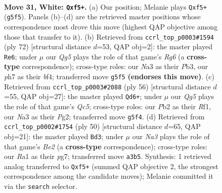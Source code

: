 \documentclass[11pt]{article}
\begin{document}
\clearpage

\begin{figure}[p]\centering
\begin{subfigure}{0.46\textwidth}\centering
\resizebox{\linewidth}{!}{%
\newchessgame
\chessboard[
  setfen={1rr5/5k1p/1p6/p4bQ1/7P/N7/PP3PP1/R5K1 w - - 9 31},
  showmover=false,
  pgfstyle=straightmove, color=movearrow, markmove={g5-f5}
]}
\caption{}
\end{subfigure}\hfill
\begin{subfigure}{0.46\textwidth}\centering
\resizebox{\linewidth}{!}{%
\newchessgame
\chessboard[
  setfen={r3r3/p6k/2p3R1/2N5/2P2bP1/1P2p3/P7/1K1R4 w - - 3 37},
  showmover=false,
  pgfstyle=straightmove, color=movearrow, markmove={g6-e6}
]}
\caption{}
\end{subfigure}
\\[4pt]
\begin{subfigure}{0.46\textwidth}\centering
\resizebox{\linewidth}{!}{%
\newchessgame
\chessboard[
  setfen={2rk3r/6b1/4p2p/2Qb2p1/PP6/8/5PPP/5RK1 w - - 1 29},
  showmover=false,
  pgfstyle=straightmove, color=movearrow, markmove={c5-d6}
]}
\caption{}
\end{subfigure}\hfill
\begin{subfigure}{0.46\textwidth}\centering
\resizebox{\linewidth}{!}{%
\newchessgame
\chessboard[
  setfen={2r5/5kpp/1p1Qbp2/8/5P2/4PK2/2r1B1PP/8 w - - 4 26},
  showmover=false,
  pgfstyle=straightmove, color=movearrow, markmove={e2-d3}
]}
\caption{}
\end{subfigure}
\caption{\textbf{Move 31, White: \texttt{Qxf5+}.} (a) Our position; Melanie plays \texttt{Qxf5+} (\texttt{g5f5}). Panels (b)--(d) are the retrieved master positions whose correspondence most drove this move (highest QAP objective among those that transfer to it). (b) Retrieved from \texttt{ccrl\_top\_p0003\#1594} (ply 72) [structural distance $d$=53, QAP obj=2]: the master played \texttt{Re6}; under $\mu$ our \emph{Qg5} plays the role of that game's \emph{Rg6} (a \textbf{cross-type} correspondence); cross-type roles: our \emph{N}a3 as their \emph{P}b3, our \emph{p}h7 as their \emph{b}f4; transferred move \texttt{g5f5} \textbf{(endorses this move)}. (c) Retrieved from \texttt{ccrl\_top\_p0003\#2088} (ply 56) [structural distance $d$=55, QAP obj=27]: the master played \texttt{Qd6+}; under $\mu$ our \emph{Qg5} plays the role of that game's \emph{Qc5}; cross-type roles: our \emph{P}b2 as their \emph{R}f1, our \emph{N}a3 as their \emph{P}g2; transferred move \texttt{g5f4}. (d) Retrieved from \texttt{ccrl\_top\_p0002\#1754} (ply 50) [structural distance $d$=65, QAP obj=21]: the master played \texttt{Bd3}; under $\mu$ our \emph{Na3} plays the role of that game's \emph{Be2} (a \textbf{cross-type} correspondence); cross-type roles: our \emph{R}a1 as their \emph{p}g7; transferred move \texttt{a3b5}. Synthesis: 1 retrieved analog transferred to \texttt{Qxf5+} (summed QAP objective 2, the strongest correspondence among the candidate moves); Melanie committed it via the \texttt{search} selector.}
\label{fig:thought-m60}
\end{figure}
\end{document}
